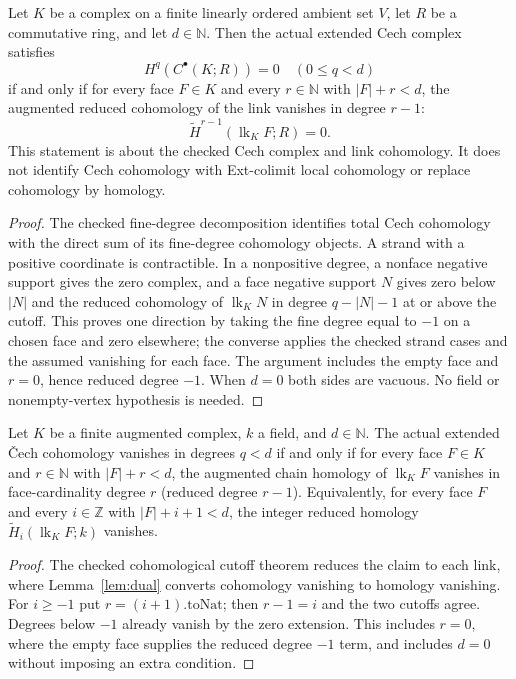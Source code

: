 \begin{theorem}\label{cor:cech-uniform-link}
Let $K$ be a complex on a finite linearly ordered ambient set $V$, let $R$
be a commutative ring, and let $d\in\mathbb N$. Then the actual extended
Cech complex satisfies
\[
 H^q(C^\bullet(K;R))=0\quad(0\le q<d)
\]
if and only if for every face $F\in K$ and every $r\in\mathbb N$ with
$|F|+r<d$, the augmented reduced cohomology of the link vanishes in degree
$r-1$:
\[
 \widetilde H^{r-1}(\operatorname{lk}_K F;R)=0.
\]
This statement is about the checked Cech complex and link cohomology. It does
not identify Cech cohomology with Ext-colimit local cohomology or replace
cohomology by homology.
\leanok
\end{theorem}
\begin{proof}
\leanok
The checked fine-degree decomposition identifies total Cech cohomology with
the direct sum of its fine-degree cohomology objects. A strand with a positive
coordinate is contractible. In a nonpositive degree, a nonface negative
support gives the zero complex, and a face negative support $N$ gives zero
below $|N|$ and the reduced cohomology of $\operatorname{lk}_K N$ in degree
$q-|N|-1$ at or above the cutoff. This proves one direction by taking the
fine degree equal to $-1$ on a chosen face and zero elsewhere; the converse
applies the checked strand cases and the assumed vanishing for each face.
The argument includes the empty face and $r=0$, hence reduced degree $-1$.
When $d=0$ both sides are vacuous. No field or nonempty-vertex hypothesis is
needed.
\end{proof}

\begin{corollary}\label{cor:cech-uniform-link-homology}
Let $K$ be a finite augmented complex, $k$ a field, and $d\in\mathbb N$.
The actual extended Čech cohomology vanishes in degrees $q<d$ if and only if
for every face $F\in K$ and $r\in\mathbb N$ with $|F|+r<d$, the augmented
chain homology of $\operatorname{lk}_K F$ vanishes in face-cardinality
degree $r$ (reduced degree $r-1$). Equivalently, for every face $F$ and
every $i\in\mathbb Z$ with $|F|+i+1<d$, the integer reduced homology
$\widetilde H_i(\operatorname{lk}_K F;k)$ vanishes.
\leanok
\end{corollary}
\begin{proof}
The checked cohomological cutoff theorem reduces the claim to each link,
where Lemma~\ref{lem:dual} converts cohomology vanishing to homology
vanishing. For $i\geq-1$ put $r=(i+1).\mathrm{toNat}$; then $r-1=i$
and the two cutoffs agree. Degrees below $-1$ already vanish by the zero
extension. This includes $r=0$, where the empty face supplies the reduced
degree $-1$ term, and includes $d=0$ without imposing an extra condition.
\end{proof}

